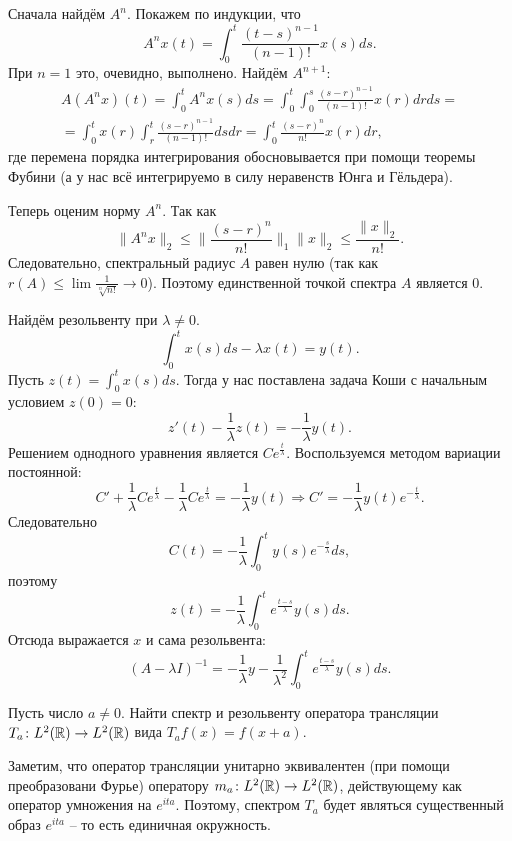 \begin{solution}
    Сначала найдём $A^n$.
    Покажем по индукции, что
    \[
        A^n x(t) = \int_0^t \frac{(t - s)^{n - 1}}{(n - 1)!}x(s)ds.
    \]
    При $n = 1$ это, очевидно, выполнено.
    Найдём $A^{n + 1}\colon$
    \begin{multline*}
        A(A^n x)(t) = \int_0^t A^n x(s)ds = \int_0^t \int_0^s \frac{(s - r)^{n - 1}}{(n - 1)!}x(r)drds = \\ = \int_0^t x(r) \int_r^t \frac{(s - r)^{n - 1}}{(n - 1)!}dsdr = \int_0^t \frac{(s - r)^n}{n!}x(r)dr,
    \end{multline*}
    где перемена порядка интегрирования обосновывается при помощи теоремы Фубини (а у нас всё интегрируемо в силу неравенств Юнга и Гёльдера).

    Теперь оценим норму $A^n$.
    Так как
    \[
        \|A^n x\|_2 \leq \|\frac{(s - r)^n}{n!}\|_1\|x\|_2 \leq \frac{\|x\|_2}{n!}.
    \]
    Следовательно, спектральный радиус $A$ равен нулю (так как $r(A) \leq \lim \frac{1}{\sqrt[n]{n!}} \rightarrow 0$). Поэтому единственной точкой спектра $A$ является $0$.

    Найдём резольвенту при $\lambda \neq 0$.
    \[
        \int_0^t x(s)ds - \lambda x(t) = y(t).
    \]
    Пусть $z(t) = \int_0^t x(s)ds$.
    Тогда у нас поставлена задача Коши с начальным условием $z(0) = 0\colon$
    \[
        z'(t) - \frac{1}{\lambda}z(t) = -\frac{1}{\lambda}y(t).
    \]
    Решением однодного уравнения является $C e^{\frac{t}{\lambda}}$.
    Воспользуемся методом вариации постоянной:
    \[
        C' + \frac{1}{\lambda}Ce^{\frac{t}{\lambda}} - \frac{1}{\lambda}Ce^{\frac{t}{\lambda}} = -\frac{1}{\lambda}y(t) \Rightarrow C' = -\frac{1}{\lambda}y(t)e^{-\frac{t}{\lambda}}.
    \]
    Следовательно
    \[
        C(t) =  -\frac{1}{\lambda}\int_0^{t} y(s) e^{-\frac{s}{\lambda}}ds,
    \]
    поэтому 
    \[
        z(t) = -\frac{1}{\lambda}\int_{0}^t e^{\frac{t - s}{\lambda}}y(s)ds.
    \]
    Отсюда выражается $x$ и сама резольвента:
    \[
        (A - \lambda I)^{-1} = -\frac{1}{\lambda}y - \frac{1}{\lambda^2}\int_0^t e^{\frac{t - s}{\lambda}}y(s)ds.
    \]
\end{solution}
\begin{task}
    Пусть число $a \neq 0$. Найти спектр и резольвенту оператора трансляции $T_a\colon L^2(\mathbb{R}) \to L^2(\mathbb{R})$ вида $T_af(x) = f(x + a)$.
\end{task}
\begin{solution}
    Заметим, что оператор трансляции унитарно эквивалентен (при помощи преобразовани Фурье) оператору $m_a\colon L^2(\mathbb{R}) \to L^2(\mathbb{R})$, действующему как оператор умножения на $e^{ita}$.
    Поэтому, спектром $T_a$ будет являться существенный образ $e^{ita}$ -- то есть единичная 
    окружность.
\end{solution}
